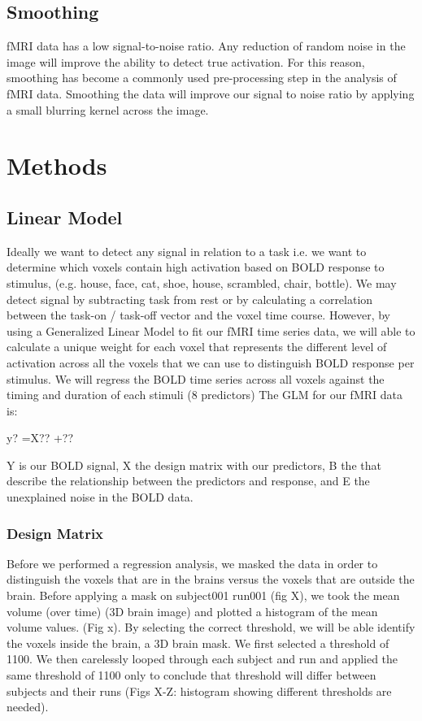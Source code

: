 \documentclass[11pt]{article}
\begin{document}
\subsection{Smoothing}

fMRI data has a low signal-to-noise ratio. Any reduction of random noise in the 
image will improve the ability to detect true activation.  For this reason, 
smoothing has become a commonly used pre-processing step in the analysis of fMRI 
data. Smoothing the data will improve our signal to noise ratio by applying a 
small blurring kernel across the image.

\section{Methods}

\subsection{Linear Model}
Ideally we want to detect any signal in relation to a task i.e. we want to 
determine which voxels contain high activation based on BOLD response to 
stimulus, (e.g. house, face, cat, shoe, house, scrambled, chair, bottle). We 
may detect signal by subtracting task from rest or by calculating a correlation 
between the task-on / task-off vector and the voxel time course. However, by 
using a Generalized Linear Model to fit our fMRI time series data, we will able 
to calculate a unique weight for each voxel that represents the different level 
of activation across all the voxels that we can use to distinguish BOLD 
response per stimulus.  We will regress the BOLD time series across all voxels 
against the timing and duration of each stimuli (8 predictors) The GLM for our 
fMRI data is:

y? =X?? +??

Y is our BOLD signal, X the design matrix with our predictors, B the that 
describe the relationship between the predictors and response, and E the 
unexplained noise in the BOLD data.

\subsubsection{Design Matrix}
Before we performed a regression analysis, we masked the data in order to 
distinguish the voxels that are in the brains versus the voxels that are 
outside the brain. Before applying a mask on subject001 run001 (fig X), we took 
the mean volume (over time) (3D brain image) and plotted a histogram of the 
mean volume values. (Fig x). By selecting the correct threshold, we will be 
able identify the voxels inside the brain, a 3D brain mask. We first selected a 
threshold of 1100. We then carelessly looped through each subject and run and 
applied the same threshold of 1100 only to conclude that threshold will differ 
between subjects and their runs (Figs X-Z: histogram showing different 
thresholds are needed). 
\end{document}
